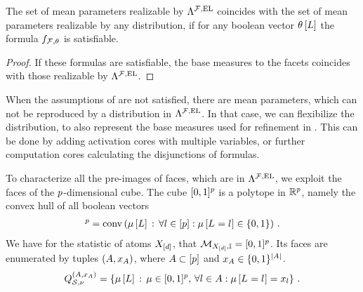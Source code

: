 \begin{theorem}
    \label{the:sufficientHLNExpressivity}
    The set of mean parameters realizable by $\Lambda^{\mathcal{F},\mathrm{EL}}$ coincides with the set of mean parameters realizable by any distribution, if for any boolean vector $\theta\left[L\right]$ the formula $f_{\mathcal{F},\theta}$ is satisfiable.
\end{theorem}
\begin{proof}
    If these formulas are satisfiable, the base measures to the facets coincides with those realizable by $\Lambda^{\mathcal{F},\mathrm{EL}}$.
\end{proof}


When the assumptions of  are not satisfied, there are mean parameters, which can not be reproduced by a distribution in $\Lambda^{\mathcal{F},\mathrm{EL}}$.
In that case, we can flexibilize the distribution, to also represent the base measures used for refinement in .
This can be done by adding activation cores with multiple variables, or further computation cores calculating the disjunctions of formulas.


To characterize all the pre-images of faces, which are in $\Lambda^{\mathcal{F},\mathrm{EL}}$, we exploit the faces of the $p$-dimensional cube.
The cube $[0,1]^{p}$ is a polytope in $\mathbb{R}^{p}$, namely the convex hull of all boolean vectors
\begin{align*}
[0,1]
    ^{\seldim} = \convhullof{\meanparamat{\selvariable}\wcols\uniquantwrtof{\selindexin}{\meanparamat{\indexedselvariable}\in\{0,1\}}} \, .
\end{align*}
We have for the statistic of atoms $X_{[d]}$, that $\mathcal{M}_{X_{[d]},\mathbb{I}}=[0,1]^{p}$.
Its faces are enumerated by tuples $(A,x_{A})$, where $A\subset[p]$ and $x_{A}\in\{0,1\}^{\left|A\right|}$.
\begin{align*}
    Q^{(A,x_{A})}_{\mathcal{S},\nu}
    = \left\{\mu\left[L\right]\,:\, \mu\in[0,1]^{p},\,\forall{l\in A}:{\mu\left[L_{}=l_{}\right]=x_{l}}\right\} \, .
\end{align*}


